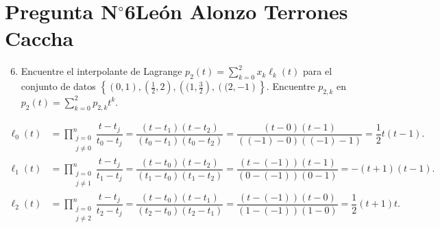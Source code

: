 \section{Pregunta N$^{\circ}$6\qquad León Alonzo Terrones Caccha}


% 

\begin{frame}
	\begin{enumerate}\setcounter{enumi}{5}
		\item

		      Encuentre el interpolante de Lagrange
		      \begin{math}
			      p_{2}\left(t\right)=
			      \sum\limits_{k=0}^{2}
			      x_{k}
			      \ell_{k}\left(t\right)
		      \end{math}
		      para el conjunto de datos
		      \begin{math}
			      \left\{
			      \left(0,1\right),
			      \left(\frac{1}{2},2\right),
			      \left((1,\frac{3}{2}\right),
                    \left((2,-1\right)
			      \right\}
		      \end{math}.
		      Encuentre $p_{2,k}$ en
		      \begin{math}
			      p_{2}\left(t\right)=
			      \sum\limits_{k=0}^{2}
			      p_{2,k}t^{k}
		      \end{math}.
	\end{enumerate}

	\begin{solution}
		\begin{align*}
			\ell_{0}\left(t\right) & =
			\prod\limits_{\substack{j=0        \\j\neq 0}}^{n}
			\dfrac{t-t_{j}}{t_{0}-t_{j}}=
			\dfrac{\left(t-t_{1}\right)\left(t-t_{2}\right)}{\left(t_{0}-t_{1}\right)\left(t_{0}-t_{2}\right)}=
			\dfrac{\left(t-0\right)\left(t-1\right)}{\left(\left(-1\right)-0\right)\left(\left(-1\right)-1\right)}=
			\dfrac{1}{2}t\left(t-1\right).     \\
			\ell_{1}\left(t\right) & =
			\prod\limits_{\substack{j=0        \\j\neq 1}}^{n}
			\dfrac{t-t_{j}}{t_{1}-t_{j}}=
			\dfrac{\left(t-t_{0}\right)\left(t-t_{2}\right)}{\left(t_{1}-t_{0}\right)\left(t_{1}-t_{2}\right)}=
			\dfrac{\left(t-\left(-1\right)\right)\left(t-1\right)}{\left(0-\left(-1\right)\right)\left(0-1\right)}=
			-\left(t+1\right)\left(t-1\right). \\
			\ell_{2}\left(t\right) & =
			\prod\limits_{\substack{j=0        \\j\neq 2}}^{n}
			\dfrac{t-t_{j}}{t_{2}-t_{j}}=
			\dfrac{\left(t-t_{0}\right)\left(t-t_{1}\right)}{\left(t_{2}-t_{0}\right)\left(t_{2}-t_{1}\right)}=
			\dfrac{\left(t-\left(-1\right)\right)\left(t-0\right)}{\left(1-\left(-1\right)\right)\left(1-0\right)}=
			\dfrac{1}{2}\left(t+1\right)t.
		\end{align*}


\end{solution}
\end{frame}
